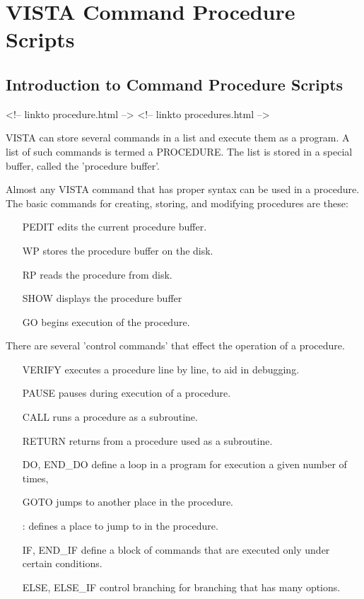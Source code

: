 \chapter{VISTA Command Procedure Scripts}

%
%

\section{Introduction to Command Procedure Scripts}
\begin{rawhtml}
<!-- linkto procedure.html -->
<!-- linkto procedures.html -->
\end{rawhtml}


VISTA can store several commands in a list and execute them as a program.
A list of such commands is termed a PROCEDURE.  The list is stored in a
special buffer, called the 'procedure buffer'.

Almost any VISTA command that has proper syntax can be used in a procedure.
The basic commands for creating, storing, and modifying procedures are
these:
\begin{itemize}
  \item[PEDIT\hfill]{edits the current procedure buffer.}
  \item[WP\hfill]{stores the procedure buffer on the disk.}
  \item[RP\hfill]{reads the procedure from disk.}
  \item[SHOW\hfill]{displays the procedure buffer}
  \item[GO\hfill]{begins execution of the procedure.}
\end{itemize}

There are several 'control commands' that effect the operation of a
procedure.
\begin{itemize}
  \item[VERIFY\hfill]{executes a procedure line by line, to aid in debugging.}
  \item[PAUSE\hfill]{pauses during execution of a procedure.}
  \item[CALL\hfill]{runs a procedure as a subroutine.}
  \item[RETURN\hfill]{returns from a procedure used as a subroutine.}
  \item[DO, END\_DO\hfill]{define a loop in a program for execution a given
       number of times,}
  \item[GOTO\hfill]{jumps to another place in the procedure.}
  \item[:\hfill]{defines a place to jump to in the procedure.}
  \item[IF, END\_IF \hfill]{define a block of commands that are executed
       only under certain conditions.}
  \item[ELSE, ELSE\_IF\hfill]{control branching for branching that has many
       options.}
\end{itemize}

